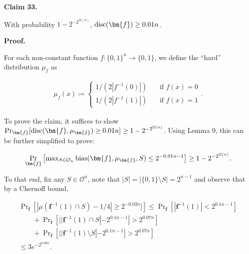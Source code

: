\documentclass[10pt,a4paper]{article}
\begin{document}


\par\medskip\noindent\textbf{
Claim 33. 
}\par



With probability $1-2^{-2^{\Omega(n)}}$, ${\textup{disc}}(\bm{f})\geq 0.01n$.\par







\par\medskip\noindent\textbf{
\textbf{Proof}.}\par




For each non-constant function $f:\{0,1\}^{n}\to\{0,1\}$, we define the “hard” distribution $\mu_{f}$ as\par


\[\begin{gathered}
\mu_{f}(x)\coloneqq\begin{cases}1/(2|f^{-1}(0)|)&\quad\text{if $f(x)=0$}\\
1/(2|f^{-1}(1)|)&\quad\text{if $f(x)=1$}\end{cases}.
\end{gathered}\]


To prove the claim, it suffices to show $\Pr_{\bm{f}}[{\textup{disc}}(\bm{f},\mu_{\bm{f}})\geq 0.01n]\geq 1-2^{-2^{\Omega(n)}}$. Using Lemma 9, this can be further simplified to prove:\par


\[\begin{gathered}
\Pr_{\bm{f}}\left[\max\nolimits_{S\in\mathcal{O}_{n}}{\textup{bias}}(\bm{f},\mu_{\bm{f}},S)\leq 2^{-0.01n-1}\right]\geq 1-2^{-2^{\Omega(n)}}.
\end{gathered}\]


To that end, fix any $S\in\mathcal{O}^{n}$, note that $|S|=|\{0,1\}\setminus S|=2^{n-1}$ and observe that by a Chernoff bound,\par


\[\begin{gathered}
\displaystyle\Pr\nolimits_{\bm{f}}\left[|\mu(\bm{f}^{-1}(1)\cap S)-1/4|\geq 2^{-0.02n}]\right] \displaystyle\leq\Pr\nolimits_{\bm{f}}\left[|\bm{f}^{-1}(1)|<2^{0.1n-1}\right] \\
\displaystyle\quad\quad+\Pr\nolimits_{\bm{f}}\left[||\bm{f}^{-1}(1)\cap S|-2^{0.1n-1}|>2^{0.07n}\right] \\
\displaystyle\quad\quad+\Pr\nolimits_{\bm{f}}\left[||\bm{f}^{-1}(1)\setminus S|-2^{0.1n-1}|>2^{0.07n}\right] \\
\displaystyle\leq 3e^{-2^{0.03n}}.
\end{gathered}\]
\end{document}
